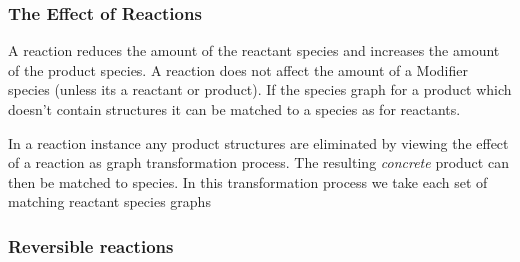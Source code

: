 \documentclass{cekarticle}
\begin{document}
\subsubsection{The Effect of Reactions}
\label{sec:effect-of-reactions}

A reaction reduces the amount of the reactant species and increases the amount of the product
species.  A reaction does not affect the amount of a Modifier species (unless its a reactant or product).
If the species graph for a product which doesn't contain  structures it can be
matched to a species as for reactants.

In a reaction instance any product  structures are eliminated by viewing the effect of
a reaction as graph transformation process.
The resulting \emph{concrete} product can then be matched to species.
In this transformation process we take each set of matching reactant species graphs 

\subsubsection{Reversible reactions}

%
%
%
%
%
%
%
%
\end{document}
